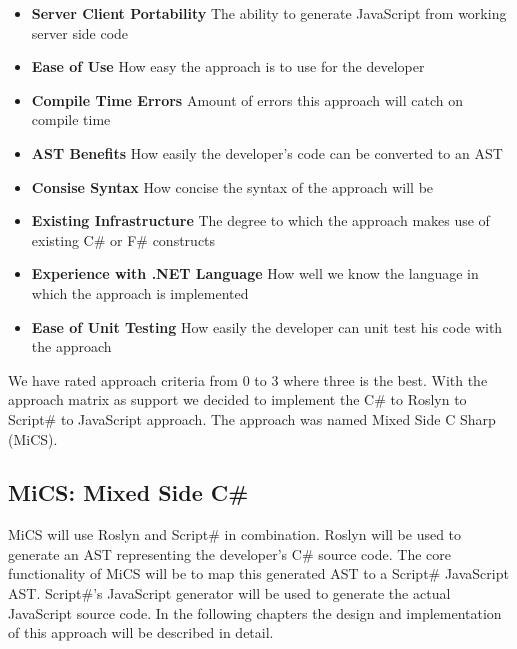 	\begin{itemize}
		\item \textbf{Server Client Portability} The ability to generate JavaScript from working server side code
		\item \textbf{Ease of Use} How easy the approach is to use for the developer
		\item \textbf{Compile Time Errors} Amount of errors this approach will catch on compile time
		\item \textbf{AST Benefits} How easily the developer's code can be converted to an AST
		\item \textbf{Consise Syntax} How concise the syntax of the approach will be
		\item \textbf{Existing Infrastructure} The degree to which the approach makes use of existing C\# or F\# constructs
		\item \textbf{Experience with .NET Language} How well we know the language in which the approach is implemented
		\item \textbf{Ease of Unit Testing} How easily the developer can unit test his code with the approach
	\end{itemize}

	We have rated approach criteria from 0 to 3 where three is the best. With the approach matrix as support we decided to implement the C\# to Roslyn to Script\# to JavaScript approach. The approach was named Mixed Side C Sharp (MiCS).

	\FloatBarrier

	\subsection{MiCS: Mixed Side C\#} %
	\label{sub:mics_mixed_side_csharp}
	MiCS will use Roslyn and Script\# in combination. Roslyn will be used to generate an AST representing the developer's C\# source code. The core functionality of MiCS will be to map this generated AST to a Script\# JavaScript AST. Script\#'s JavaScript generator will be used to generate the actual JavaScript source code. In the following chapters the design and implementation of this approach will be described in detail.


